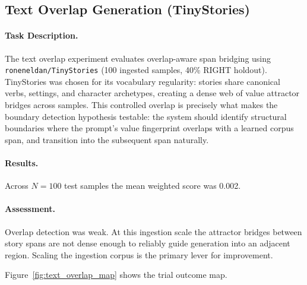 \subsection{Text Overlap Generation (TinyStories)}
\label{sec:text_overlap}

\paragraph{Task Description.}
The text overlap experiment evaluates overlap-aware span bridging using
\texttt{roneneldan/TinyStories} (100 ingested samples, 40\% RIGHT holdout).
TinyStories was chosen for its vocabulary regularity: stories share canonical
verbs, settings, and character archetypes, creating a dense web of value
attractor bridges across samples.  This controlled overlap is precisely
what makes the boundary detection hypothesis testable: the system should
identify structural boundaries where the prompt's value fingerprint overlaps
with a learned corpus span, and transition into the subsequent span
naturally.

\paragraph{Results.}
Across $N = 100$ test samples the mean weighted score was 0.002.

\paragraph{Assessment.}
Overlap detection was weak.  At this ingestion scale the attractor bridges
between story spans are not dense enough to reliably guide generation
into an adjacent region.  Scaling the ingestion corpus is the primary
lever for improvement.

Figure~\ref{fig:text_overlap_map} shows the trial outcome map.
